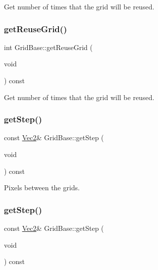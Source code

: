Get number of times that the grid will be reused. \mbox{\label{classGridBase_a9f4b58b73b1986c40f6eee27ed7ddd99}} 
\subsubsection{\texorpdfstring{get\+Reuse\+Grid()}{getReuseGrid()}\hspace{0.1cm}{\footnotesize\ttfamily [2/2]}}
{\footnotesize\ttfamily int Grid\+Base\+::get\+Reuse\+Grid (\begin{DoxyParamCaption}\item[{void}]{ }\end{DoxyParamCaption}) const\hspace{0.3cm}{\ttfamily [inline]}}

Get number of times that the grid will be reused. \mbox{\label{classGridBase_a2899bd462ba7aae36eb706c94ba51016}} 
\subsubsection{\texorpdfstring{get\+Step()}{getStep()}\hspace{0.1cm}{\footnotesize\ttfamily [1/2]}}
{\footnotesize\ttfamily const \hyperlink{classVec2}{Vec2}\& Grid\+Base\+::get\+Step (\begin{DoxyParamCaption}\item[{void}]{ }\end{DoxyParamCaption}) const\hspace{0.3cm}{\ttfamily [inline]}}

Pixels between the grids. \mbox{\label{classGridBase_aff25f0fbdf81662b2b54e37dd2c0023c}} 
\subsubsection{\texorpdfstring{get\+Step()}{getStep()}\hspace{0.1cm}{\footnotesize\ttfamily [2/2]}}
{\footnotesize\ttfamily const \hyperlink{classVec2}{Vec2}\& Grid\+Base\+::get\+Step (\begin{DoxyParamCaption}\item[{void}]{ }\end{DoxyParamCaption}) const\hspace{0.3cm}{\ttfamily [inline]}}

